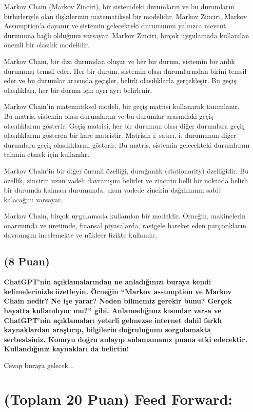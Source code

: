 \documentclass[11pt]{article}
\begin{document}
Markov Chain (Markov Zinciri), bir sistemdeki durumların ve bu durumların birbirleriyle olan ilişkilerinin matematiksel bir modelidir. Markov Zinciri, Markov Assumption'a dayanır ve sistemin gelecekteki durumunun yalnızca mevcut durumuna bağlı olduğunu varsayar. Markov Zinciri, birçok uygulamada kullanılan önemli bir olasılık modelidir.

Markov Chain, bir dizi durumdan oluşur ve her bir durum, sistemin bir anlık durumunu temsil eder. Her bir durum, sistemin olası durumlarından birini temsil eder ve bu durumlar arasında geçişler, belirli olasılıklarla gerçekleşir. Bu geçiş olasılıkları, her bir durum için ayrı ayrı belirlenir.

Markov Chain'in matematiksel modeli, bir geçiş matrisi kullanarak tanımlanır. Bu matris, sistemin olası durumlarını ve bu durumlar arasındaki geçiş olasılıklarını gösterir. Geçiş matrisi, her bir durumun olası diğer durumlara geçiş olasılıklarını gösteren bir kare matristir. Matrisin i. satırı, i. durumunun diğer durumlara geçiş olasılıklarını gösterir. Bu matris, sistemin gelecekteki durumlarını tahmin etmek için kullanılır.

Markov Chain'in bir diğer önemli özelliği, durağanlık (stationarity) özelliğidir. Bu özellik, zincirin uzun vadeli davranışını belirler ve zincirin belli bir noktada belirli bir durumda kalması durumunda, uzun vadede zincirin dağılımının sabit kalacağını varsayar.

Markov Chain, birçok uygulamada kullanılan bir modeldir. Örneğin, makinelerin onarımında ve üretimde, finansal piyasalarda, rastgele hareket eden parçacıkların davranışını incelemekte ve nükleer fizikte kullanılır.

\subsection{(8 Puan)} \textbf{ChatGPT’nin açıklamalarından ne anladığınızı buraya kendi kelimelerinizle özetleyin. Örneğin ``Markov assumption ve Markov Chain nedir? Ne işe yarar? Neden bilmemiz gerekir bunu? Gerçek hayatta kullanılıyor mu?'' gibi. Anlamadığınız kısımlar varsa ve ChatGPT’nin açıklamaları yeterli gelmezse internet dahil farklı kaynaklardan araştırıp, bilgilerin doğruluğunu sorgulamakta serbestsiniz. Konuyu doğru anlayıp anlamamanız puana etki edecektir. Kullandığınız kaynakları da belirtin!}

Cevap buraya gelecek...

\section{(Toplam 20 Puan) Feed Forward:}
 
\end{document}
